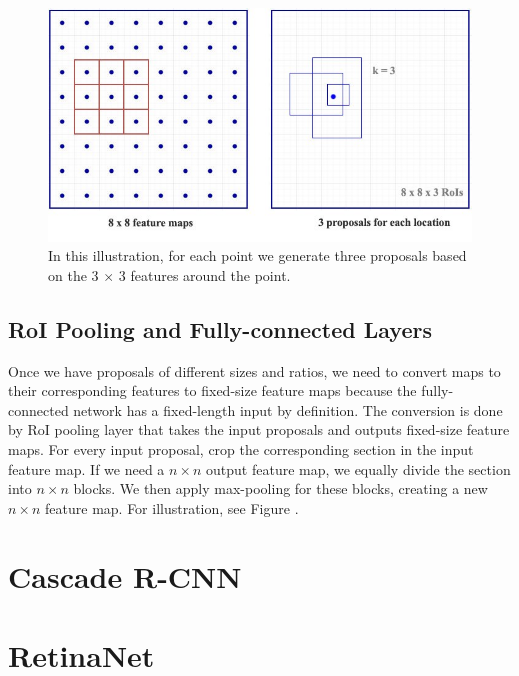 \begin{figure}[h]
    \centering
    \includegraphics[width=0.7\linewidth]{Sources/Figures/rpn.jpeg}
    \caption{In this illustration, for each point we generate three proposals based on the 3 $\times$ 3 features around the point. }
    \label{fig:rpn}
\end{figure}

\subsection{RoI Pooling and Fully-connected Layers}
Once we have proposals of different sizes and ratios, we need to convert maps to their corresponding features to fixed-size feature maps because the fully-connected network has a fixed-length input by definition. The conversion is done by RoI pooling layer that takes the input proposals and outputs fixed-size feature maps.  For every input proposal, crop the corresponding section in the input feature map. If we need a $n \times n$ output feature map, we equally divide the section into $n \times n$ blocks. We then apply max-pooling for these blocks, creating a new $n \times n$ feature map. For illustration, see Figure .

\section{Cascade R-CNN}
\section{RetinaNet}

